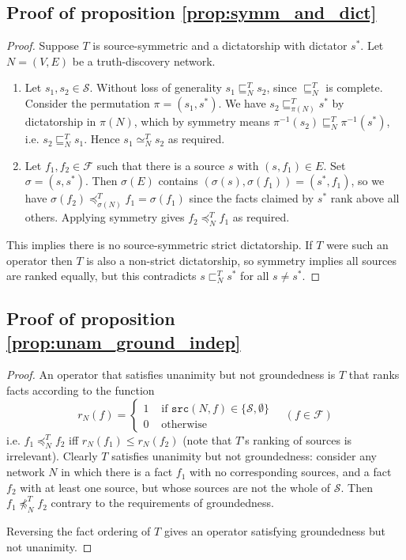 \documentclass{article}
\theoremstyle{definition} \newtheorem{definition}{Definition}
\theoremstyle{definition} \newtheorem{example}{Example}
\theoremstyle{plain} \newtheorem{axiom}{Axiom}
\theoremstyle{plain} \newtheorem*{remark}{Remark}
\theoremstyle{remark} \newtheorem*{notation}{Notation}
\theoremstyle{plain} \newtheorem{lemma}{Lemma}
\theoremstyle{plain} \newtheorem{theorem}{Theorem}
\theoremstyle{plain} \newtheorem{proposition}{Proposition}
\renewcommand{\S}{\mathcal{S}}  %
\newcommand{\F}{\mathcal{F}}
\newcommand{\sle}{\sqsubseteq}
\newcommand{\slt}{\sqsubset}
\newcommand{\seq}{\simeq}
\newcommand{\fle}{\preceq}
\newcommand{\src}{\texttt{src}}
\begin{document}
\subsection{Proof of proposition \ref{prop:symm_and_dict}}
\begin{proof}

Suppose $T$ is source-symmetric and a dictatorship with dictator $s^*$. Let
$N=(V,E)$ be a truth-discovery network.
\begin{enumerate}
\item
    Let $s_1, s_2 \in \S$. Without loss of generality $s_1 \sle_N^T s_2$, since
    $\sle_N^T$ is complete. Consider the permutation $\pi=(s_1, s^*)$.  We have
    $s_2 \sle_{\pi(N)}^T s^*$ by dictatorship in $\pi(N)$, which by symmetry
    means $\pi^{-1}(s_2) \sle_N^T \pi^{-1}(s^*)$, i.e. $s_2 \sle_N^T s_1$.
    Hence $s_1 \seq_N^T s_2$ as required.

\item
    Let $f_1, f_2 \in \F$ such that there is a source $s$ with $(s, f_1) \in E$.
    Set $\sigma=(s, s^*)$. Then $\sigma(E)$ contains $(\sigma(s), \sigma(f_1))
    = (s^*, f_1)$, so we have $\sigma(f_2) \fle_{\sigma(N)}^T f_1 =
    \sigma(f_1)$ since the facts claimed by $s^*$ rank above all others.
    Applying symmetry gives $f_2 \fle_N^T f_1$ as required.
\end{enumerate}

This implies there is no source-symmetric strict dictatorship. If $T$ were such
an operator then $T$ is also a non-strict dictatorship, so symmetry implies
all sources are ranked equally, but this contradicts $s \slt_N^T s^*$ for all
$s \ne s^*$.

\end{proof}

\subsection{Proof of proposition \ref{prop:unam_ground_indep}}
\begin{proof}

An operator that satisfies unanimity but not groundedness is $T$ that ranks
facts according to the function
$$
    r_N(f) = \begin{cases}
        1 & \text{ if } \src(N, f) \in \{\S, \emptyset\} \\
        0 & \text{ otherwise}
    \end{cases}
    \quad (f \in \F)
$$
i.e. $f_1 \fle_N^T f_2$ iff $r_N(f_1) \le r_N(f_2)$ (note that $T$'s ranking of
sources is irrelevant). Clearly $T$ satisfies unanimity but not groundedness:
consider any network $N$ in which there is a fact $f_1$ with no corresponding
sources, and a fact $f_2$ with at least one source, but whose sources are not
the whole of $\S$. Then $f_1 \not\fle_N^T f_2$ contrary to the requirements of
groundedness.

Reversing the fact ordering of $T$ gives an operator satisfying groundedness
but not unanimity.

\end{proof}
\end{document}
